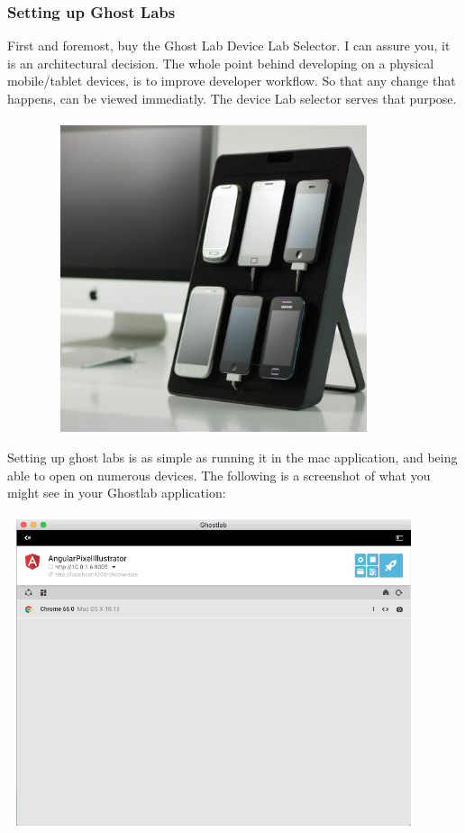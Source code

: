 \subsubsection{ Setting up Ghost Labs }
First and foremost, buy the Ghost Lab Device Lab Selector. I can assure you, it
is an architectural decision. The whole point behind developing on a physical
mobile/tablet devices, is to improve developer workflow. So that any change that
happens, can be viewed immediatly. The device Lab selector serves that purpose.
\\
\\
\includegraphics[width=12.1cm, height=9cm]{pwa-toolset-physical-devices/device-lab-stand}

Setting up ghost labs is as simple as running it in the mac application, and
being able to open on numerous devices. The following is a screenshot of what
you might see in your Ghostlab application:
\\
\\
\includegraphics[width=12.1cm, height=9cm]{pwa-toolset-physical-devices/ghostlabs-screenshot}

